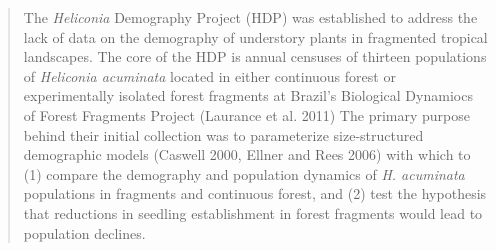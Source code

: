 \documentclass[
  12pt,
  man, donotrepeattitle]{apa6}
\begin{document}
\begin{quote}
The \emph{Heliconia} Demography Project (HDP) was established to address the lack of data on the demography of understory plants in fragmented tropical landscapes. The core of the HDP is annual censuses of thirteen populations of \emph{Heliconia acuminata} located in either continuous forest or experimentally isolated forest fragments at Brazil's Biological Dynamiocs of Forest Fragments Project (Laurance et al. 2011) The primary purpose behind their initial collection was to parameterize size-structured demographic models (Caswell 2000, Ellner and Rees 2006) with which to (1) compare the demography and population dynamics of \emph{H. acuminata} populations in fragments and continuous forest, and (2) test the hypothesis that reductions in seedling establishment in forest fragments would lead to population declines.
\end{quote}
\end{document}
